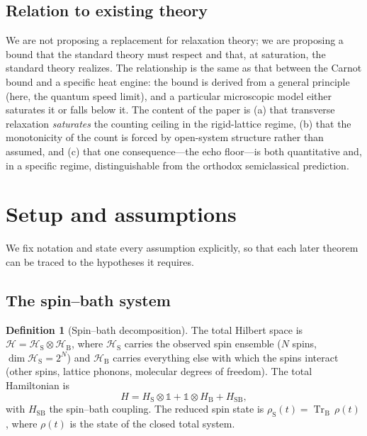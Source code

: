 \documentclass[twocolumn,10pt,a4paper]{article}
\theoremstyle{thmstyle}
\theoremstyle{definition}
\newtheorem{definition}[theorem]{Definition}
\theoremstyle{remark}
\newcommand{\Hilb}{\mathcal{H}}
\newcommand{\Tr}{\operatorname{Tr}}
\newcommand{\sysrho}{\rho_{\mathrm{S}}}
\begin{document}
\subsection{Relation to existing theory}

We are not proposing a replacement for relaxation theory; we are
proposing a bound that the standard theory must respect and that, at
saturation, the standard theory realizes. The relationship is the same as
that between the Carnot bound and a specific heat engine: the bound is
derived from a general principle (here, the quantum speed limit), and a
particular microscopic model either saturates it or falls below it. The
content of the paper is (a) that transverse relaxation \emph{saturates}
the counting ceiling in the rigid-lattice regime, (b) that the
monotonicity of the count is forced by open-system structure rather than
assumed, and (c) that one consequence---the echo floor---is both
quantitative and, in a specific regime, distinguishable from the
orthodox semiclassical prediction.

\section{Setup and assumptions}
\label{sec:setup}

We fix notation and state every assumption explicitly, so that each later
theorem can be traced to the hypotheses it requires.

\subsection{The spin--bath system}

\begin{definition}[Spin--bath decomposition]
\label{def:sysbath}
The total Hilbert space is $\Hilb=\Hilb_{\mathrm{S}}\otimes
\Hilb_{\mathrm{B}}$, where $\Hilb_{\mathrm{S}}$ carries the observed spin
ensemble ($N$ spins, $\dim\Hilb_{\mathrm{S}}=2^{N}$) and
$\Hilb_{\mathrm{B}}$ carries everything else with which the spins
interact (other spins, lattice phonons, molecular degrees of freedom). The
total Hamiltonian is
\begin{equation}
H = H_{\mathrm{S}}\otimes\mathbb{1}
  + \mathbb{1}\otimes H_{\mathrm{B}}
  + H_{\mathrm{SB}},
\label{eq:Htotal}
\end{equation}
with $H_{\mathrm{SB}}$ the spin--bath coupling. The reduced spin state is
$\sysrho(t)=\Tr_{\mathrm{B}}\,\rho(t)$, where $\rho(t)$ is the state of
the closed total system.
\end{definition}
\end{document}
